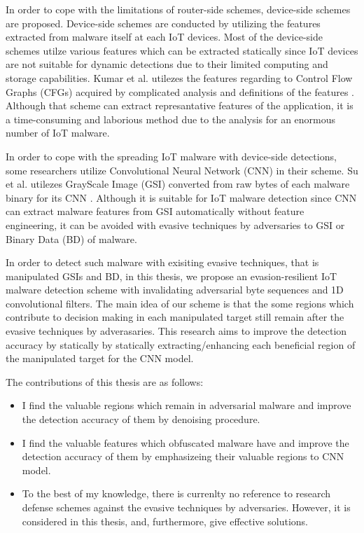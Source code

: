 \documentclass{ieeeaccess}
\begin{document}
In order to cope with the limitations of router-side schemes, device-side schemes are proposed.
Device-side schemes are conducted by utilizing the features extracted from malware itself at each IoT devices.
Most of the device-side schemes utilze various features which can be extracted statically since IoT devices are not suitable for dynamic detections due to their limited computing and storage capabilities.
Kumar et al. utilezes the features regarding to Control Flow Graphs (CFGs) acquired by complicated analysis and definitions of the features \cite{cfg}.
Although that scheme can extract represantative features of the application, it is a time-consuming and laborious method due to the analysis for an enormous number of IoT malware.

In order to cope with the spreading IoT malware with device-side detections, some researchers utilize Convolutional Neural Network (CNN) in their scheme.
Su et al. utilezes GrayScale Image (GSI) converted from raw bytes of each malware binary for its CNN \cite{previous}.
Although it is suitable for IoT malware detection since CNN can extract malware features from GSI automatically without feature engineering, it can be avoided with evasive techniques by adversaries to GSI or Binary Data (BD) of malware. 

In order to detect such malware with exisiting evasive techniques, that is manipulated GSIs and BD, in this thesis, we propose an evasion-resilient IoT malware detection scheme with invalidating adversarial byte sequences and 1D convolutional filters.
The main idea of our scheme is that the some regions which contribute to decision making in each manipulated target still remain after the evasive techniques by adverasaries. 
This research aims to improve the detection accuracy by statically by statically extracting/enhancing each beneficial region of the manipulated target for the CNN model.

The contributions of this thesis are as follows: 
\begin{itemize}
 \item I find the valuable regions which remain in adversarial malware and improve the detection accuracy of them by denoising procedure.
 \item I find the valuable features which obfuscated malware have and improve the detection accuracy of them by emphasizeing their valuable regions to CNN model.
 \item To the best of my knowledge, there is currenlty no reference to research defense schemes against the evasive techniques by adversaries. However, it is considered in this thesis, and, furthermore, give effective solutions.
\end{itemize}
\end{document}
